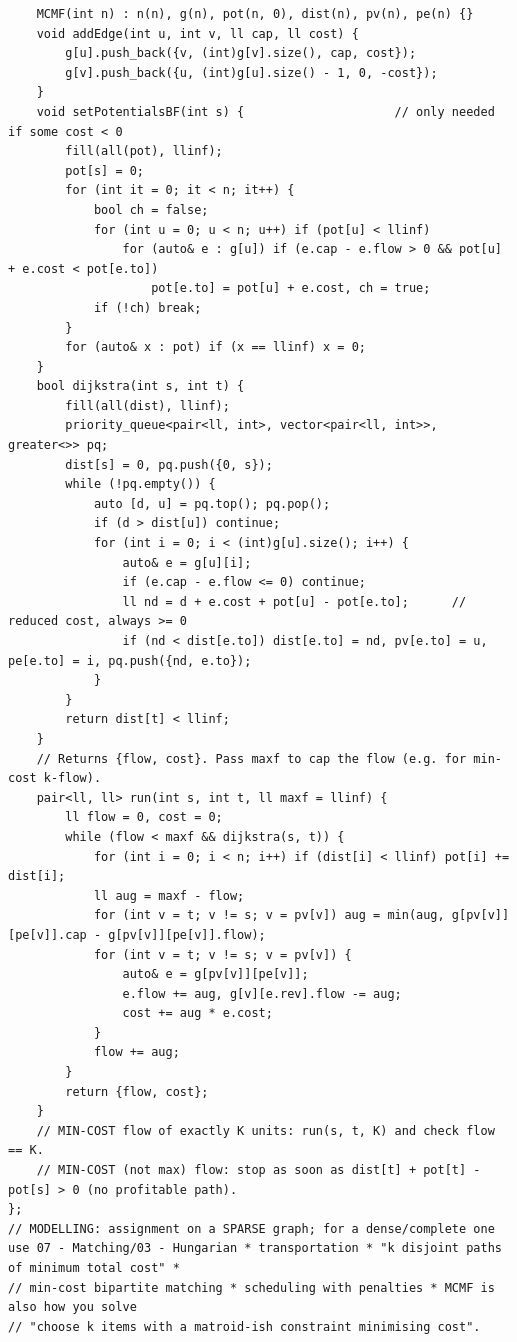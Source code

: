 \documentclass[9pt,a4paper,twocolumn]{extarticle}
\begin{document}
\begin{lstlisting}
    MCMF(int n) : n(n), g(n), pot(n, 0), dist(n), pv(n), pe(n) {}
    void addEdge(int u, int v, ll cap, ll cost) {
        g[u].push_back({v, (int)g[v].size(), cap, cost});
        g[v].push_back({u, (int)g[u].size() - 1, 0, -cost});
    }
    void setPotentialsBF(int s) {                     // only needed if some cost < 0
        fill(all(pot), llinf);
        pot[s] = 0;
        for (int it = 0; it < n; it++) {
            bool ch = false;
            for (int u = 0; u < n; u++) if (pot[u] < llinf)
                for (auto& e : g[u]) if (e.cap - e.flow > 0 && pot[u] + e.cost < pot[e.to])
                    pot[e.to] = pot[u] + e.cost, ch = true;
            if (!ch) break;
        }
        for (auto& x : pot) if (x == llinf) x = 0;
    }
    bool dijkstra(int s, int t) {
        fill(all(dist), llinf);
        priority_queue<pair<ll, int>, vector<pair<ll, int>>, greater<>> pq;
        dist[s] = 0, pq.push({0, s});
        while (!pq.empty()) {
            auto [d, u] = pq.top(); pq.pop();
            if (d > dist[u]) continue;
            for (int i = 0; i < (int)g[u].size(); i++) {
                auto& e = g[u][i];
                if (e.cap - e.flow <= 0) continue;
                ll nd = d + e.cost + pot[u] - pot[e.to];      // reduced cost, always >= 0
                if (nd < dist[e.to]) dist[e.to] = nd, pv[e.to] = u, pe[e.to] = i, pq.push({nd, e.to});
            }
        }
        return dist[t] < llinf;
    }
    // Returns {flow, cost}. Pass maxf to cap the flow (e.g. for min-cost k-flow).
    pair<ll, ll> run(int s, int t, ll maxf = llinf) {
        ll flow = 0, cost = 0;
        while (flow < maxf && dijkstra(s, t)) {
            for (int i = 0; i < n; i++) if (dist[i] < llinf) pot[i] += dist[i];
            ll aug = maxf - flow;
            for (int v = t; v != s; v = pv[v]) aug = min(aug, g[pv[v]][pe[v]].cap - g[pv[v]][pe[v]].flow);
            for (int v = t; v != s; v = pv[v]) {
                auto& e = g[pv[v]][pe[v]];
                e.flow += aug, g[v][e.rev].flow -= aug;
                cost += aug * e.cost;
            }
            flow += aug;
        }
        return {flow, cost};
    }
    // MIN-COST flow of exactly K units: run(s, t, K) and check flow == K.
    // MIN-COST (not max) flow: stop as soon as dist[t] + pot[t] - pot[s] > 0 (no profitable path).
};
// MODELLING: assignment on a SPARSE graph; for a dense/complete one use 07 - Matching/03 - Hungarian * transportation * "k disjoint paths of minimum total cost" *
// min-cost bipartite matching * scheduling with penalties * MCMF is also how you solve
// "choose k items with a matroid-ish constraint minimising cost".
\end{lstlisting}
\end{document}
